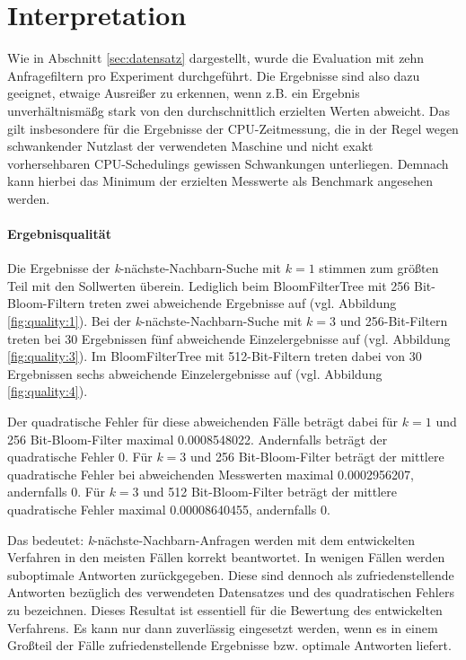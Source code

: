 \section{Interpretation}\label{sec:interpretation}
Wie in Abschnitt \ref{sec:datensatz} dargestellt, wurde die Evaluation mit zehn Anfragefiltern pro Experiment durchgeführt. Die Ergebnisse sind also dazu geeignet, etwaige Ausreißer zu erkennen, wenn z.B. ein Ergebnis unverhältnismäßg stark von den durchschnittlich erzielten Werten abweicht. Das gilt insbesondere für die Ergebnisse der CPU-Zeitmessung, die in der Regel wegen schwankender Nutzlast der verwendeten Maschine und nicht exakt vorhersehbaren CPU-Schedulings gewissen Schwankungen unterliegen. Demnach kann hierbei das Minimum der erzielten Messwerte als Benchmark angesehen werden. 
\paragraph*{Ergebnisqualität}
Die Ergebnisse der \textit{k}-nächste-Nachbarn-Suche mit $k=1$ stimmen zum größten Teil mit den Sollwerten überein. Lediglich beim BloomFilterTree mit 256 Bit-Bloom-Filtern treten zwei abweichende Ergebnisse auf (vgl. Abbildung \ref{fig:quality:1}). Bei der \textit{k}-nächste-Nachbarn-Suche mit $k=3$ und 256-Bit-Filtern treten bei 30 Ergebnissen fünf abweichende Einzelergebnisse auf (vgl. Abbildung \ref{fig:quality:3}). Im BloomFilterTree mit 512-Bit-Filtern treten dabei von 30 Ergebnissen sechs abweichende Einzelergebnisse auf (vgl. Abbildung \ref{fig:quality:4}). 

Der quadratische Fehler für diese abweichenden Fälle beträgt dabei für $k=1$ und 256 Bit-Bloom-Filter maximal 0.0008548022. Andernfalls beträgt der quadratische Fehler 0. Für $k=3$ und 256 Bit-Bloom-Filter beträgt der mittlere quadratische Fehler bei abweichenden Messwerten maximal 0.0002956207, andernfalls 0. Für $k=3$ und 512 Bit-Bloom-Filter beträgt der mittlere quadratische Fehler maximal 0.00008640455, andernfalls 0.

Das bedeutet: \textit{k}-nächste-Nachbarn-Anfragen werden mit dem entwickelten Verfahren in den meisten Fällen korrekt beantwortet. In wenigen Fällen werden suboptimale Antworten zurückgegeben. Diese sind dennoch als zufriedenstellende Antworten bezüglich des verwendeten Datensatzes und des quadratischen Fehlers zu bezeichnen. Dieses Resultat ist essentiell für die Bewertung des entwickelten Verfahrens. Es kann nur dann zuverlässig eingesetzt werden, wenn es in einem Großteil der Fälle zufriedenstellende Ergebnisse bzw. optimale Antworten liefert. 
